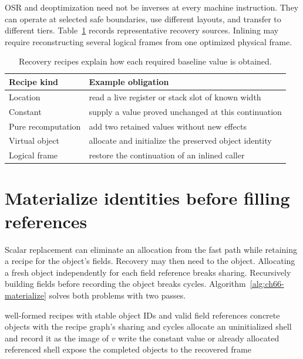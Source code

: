 OSR and deoptimization need not be inverses at every machine instruction.
They can operate at selected safe boundaries, use different layouts, and transfer to different tiers.
Table~\ref{tab:ch66-recipes} records representative recovery sources.
Inlining may require reconstructing several logical frames from one optimized physical frame.

\begin{table}[htbp]
\caption{Recovery recipes explain how each required baseline value is obtained.}
\label{tab:ch66-recipes}
\centering
\begin{tabular}{ll}
\toprule
Recipe kind & Example obligation \\
\midrule
Location & read a live register or stack slot of known width \\
Constant & supply a value proved unchanged at this continuation \\
Pure recomputation & add two retained values without new effects \\
Virtual object & allocate and initialize the preserved object identity \\
Logical frame & restore the continuation of an inlined caller \\
\bottomrule
\end{tabular}
\end{table}

\section{Materialize identities before filling references}
\label{sec:ch66-objects}

Scalar replacement can eliminate an allocation from the fast path while retaining a recipe for the object's fields.
Recovery may then need to  the object.
Allocating a fresh object independently for each field reference breaks sharing.
Recursively building fields before recording the object breaks cycles.
Algorithm~\ref{alg:ch66-materialize} solves both problems with two passes.

\begin{algorithm}[htbp]
\caption{Materialize a finite virtual-object graph while preserving identity.}
\label{alg:ch66-materialize}
\begin{pseudocode}
\Require well-formed recipes with stable object IDs and valid field references
\Ensure concrete objects with the recipe graph's sharing and cycles
  \State allocate an uninitialized shell and record it as the image of $v$
\EndFor
{}
    \State write the constant value or already allocated referenced shell
  \EndFor
\EndFor
\State expose the completed objects to the recovered frame
\end{pseudocode}
\end{algorithm}

